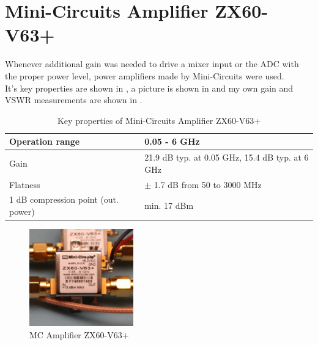\section{Mini-Circuits Amplifier ZX60-V63+}
Whenever additional gain was needed to drive a mixer input or the \gls{ADC}
with the proper power level, power amplifiers made by Mini-Circuits were used. \\

It's key properties are shown in , a picture is shown in
 and my own gain and \gls{VSWR} measurements are shown in
. \\

\begin{table}
  \centering
  \begin{tabular}{|l|l|}
    \hline
    Operation range & 0.05 - 6 GHz \\ \hline
    Gain & 21.9 dB typ. at 0.05 GHz, 15.4 dB typ. at 6 GHz \\ \hline
    Flatness & $\pm$ 1.7 dB from 50 to 3000 MHz \\ \hline
    1 dB compression point (out. power) & min. 17 dBm \\ \hline
  \end{tabular}
  \caption{Key properties of Mini-Circuits Amplifier ZX60-V63+ \cite{mc_zx60}}
  \label{tab:comp_zx60}
\end{table}

\begin{figure}[p]
  \centering
  \includegraphics[width=0.4\textwidth]{pictures/ZX60-V63+}
  \caption{\gls{MC} Amplifier ZX60-V63+}
  \label{fig:comp_zx60_pic}
\end{figure}

